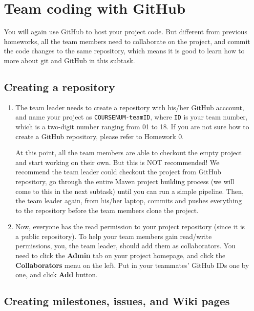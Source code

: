 
\section{Team coding with GitHub}

You will again use GitHub to host your project code. But different from previous
homeworks, all the team members need to collaborate on the project, and commit
the code changes to the same repository, which means it is good to learn how to
more about git and GitHub in this subtask.

\subsection{Creating a repository}

\begin{enumerate}

\item The team leader needs to create a repository with his/her GitHub acccount,
and name your project as \texttt{COURSENUM-teamID}, where \texttt{ID} is your team
number, which is a two-digit number ranging from 01 to 18. If you are not sure
how to create a GitHub repository, please refer to Homework 0.

At this point, all the team members are able to checkout the empty project and
start working on their own. But this is NOT recommended! We recommend the team
leader could checkout the project from GitHub repository, go through the entire
Maven project building process (we will come to this in the next subtask) until
you can run a simple pipeline. Then, the team leader again, from
his/her laptop, commits and pushes everything to the repository before the team
members clone the project.

\item Now, everyone has the read permission to your project repository (since it
is a public repository). To help your team members gain read/write permissions,
you, the team leader, should add them as collaborators. You need to click the
\textbf{Admin} tab on your project homepage, and click the
\textbf{Collaborators} menu on the left. Put in your teammates' GitHub IDs one
by one, and click \textbf{Add} button.

\end{enumerate}

\subsection{Creating milestones, issues, and Wiki pages}

